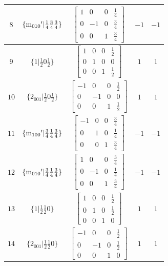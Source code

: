 \documentclass[fleqn,8pt]{jsarticle}
\begin{document}
\begin{longtable}{ccccc}
$ 8 $ & $ \{{\rm m}_{010}{}'|\frac{1}{4} \frac{3}{4} \frac{3}{4}\} $ & $ \begin{bmatrix} 1 & 0 & 0 & \frac{1}{4} \\ 0 & -1 & 0 & \frac{3}{4} \\ 0 & 0 & 1 & \frac{3}{4} \end{bmatrix} $ & $ -1 $ & $ -1 $ \\ \hline
$ 9 $ & $ \{1|\frac{1}{2} 0 \frac{1}{2}\} $ & $ \begin{bmatrix} 1 & 0 & 0 & \frac{1}{2} \\ 0 & 1 & 0 & 0 \\ 0 & 0 & 1 & \frac{1}{2} \end{bmatrix} $ & $ 1 $ & $ 1 $ \\ \hline
$ 10 $ & $ \{2{}_{001}|\frac{1}{2} 0 \frac{1}{2}\} $ & $ \begin{bmatrix} -1 & 0 & 0 & \frac{1}{2} \\ 0 & -1 & 0 & 0 \\ 0 & 0 & 1 & \frac{1}{2} \end{bmatrix} $ & $ 1 $ & $ 1 $ \\ \hline
$ 11 $ & $ \{{\rm m}_{100}{}'|\frac{3}{4} \frac{1}{4} \frac{3}{4}\} $ & $ \begin{bmatrix} -1 & 0 & 0 & \frac{3}{4} \\ 0 & 1 & 0 & \frac{1}{4} \\ 0 & 0 & 1 & \frac{3}{4} \end{bmatrix} $ & $ -1 $ & $ -1 $ \\ \hline
$ 12 $ & $ \{{\rm m}_{010}{}'|\frac{3}{4} \frac{1}{4} \frac{3}{4}\} $ & $ \begin{bmatrix} 1 & 0 & 0 & \frac{3}{4} \\ 0 & -1 & 0 & \frac{1}{4} \\ 0 & 0 & 1 & \frac{3}{4} \end{bmatrix} $ & $ -1 $ & $ -1 $ \\ \hline
$ 13 $ & $ \{1|\frac{1}{2} \frac{1}{2} 0\} $ & $ \begin{bmatrix} 1 & 0 & 0 & \frac{1}{2} \\ 0 & 1 & 0 & \frac{1}{2} \\ 0 & 0 & 1 & 0 \end{bmatrix} $ & $ 1 $ & $ 1 $ \\ \hline
$ 14 $ & $ \{2{}_{001}|\frac{1}{2} \frac{1}{2} 0\} $ & $ \begin{bmatrix} -1 & 0 & 0 & \frac{1}{2} \\ 0 & -1 & 0 & \frac{1}{2} \\ 0 & 0 & 1 & 0 \end{bmatrix} $ & $ 1 $ & $ 1 $ \\ \hline

\end{longtable}
\end{document}
